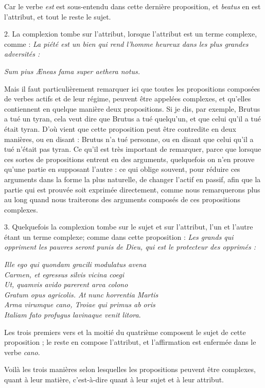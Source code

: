 Car le verbe \emph{est} est sous-entendu dans cette dernière proposition, et \emph{beatus} en est l'attribut, et tout le reste le sujet.

\bigbreak
{2.} La complexion tombe sur l'attribut, lorsque l'attribut est un terme complexe, comme : \emph{La piété est un bien qui rend l'homme heureux dans les plus grandes adversités :}\begin{center}\emph{Sum pius Æneas fama super aethera notus.}\end{center}

Mais il faut particulièrement remarquer ici que toutes les propositions composées de verbes actifs et de leur régime, peuvent être appelées complexes, et qu'elles contiennent en quelque manière deux propositions. Si je dis, par exemple, Brutus a tué un tyran, cela veut dire que Brutus a tué quelqu'un, et que celui qu'il a tué était tyran. D'où vient que cette proposition peut être contredite en deux manières, ou en disant : Brutus n'a tué personne, ou en disant que celui qu'il a tué n'était pas tyran. Ce qu'il est très important de remarquer, parce que lorsque ces sortes de propositions entrent en des arguments, quelquefois on n'en prouve qu'une partie en supposant l'autre : ce qui oblige souvent, pour réduire ces arguments dans la forme la plus naturelle, de changer l'actif en passif, afin que la partie qui est prouvée soit exprimée directement, comme nous remarquerons plus au long quand nous traiterons des arguments composés de ces propositions complexes.

\bigbreak
{3.} Quelquefois la complexion tombe sur le sujet et sur l'attribut, l'un et l'autre étant un terme complexe; comme dans cette proposition : \emph{Les grands qui oppriment les pauvres seront punis de Dieu, qui est le protecteur des opprimés :}\begin{center}\emph{Ille ego qui quondam gracili modulatus avena \\ Carmen, et egressus silvis vicina coegi \\ Ut, quamvis avido parerent arva colono \\ Gratum opus agricolis. At nunc horrentia Martis \\ Arma virumque cano, Troiae qui primus ab oris \\ Italiam fato profugus lavinaque venit litora}.\end{center}

Les trois premiers vers et la moitié du quatrième composent le sujet de cette proposition ; le reste en compose l'attribut, et l'affirmation est enfermée dans le verbe \emph{cano}.

Voilà les trois manières selon lesquelles les propositions peuvent être complexes, quant à leur matière, c'est-à-dire quant à leur sujet et à leur attribut.

